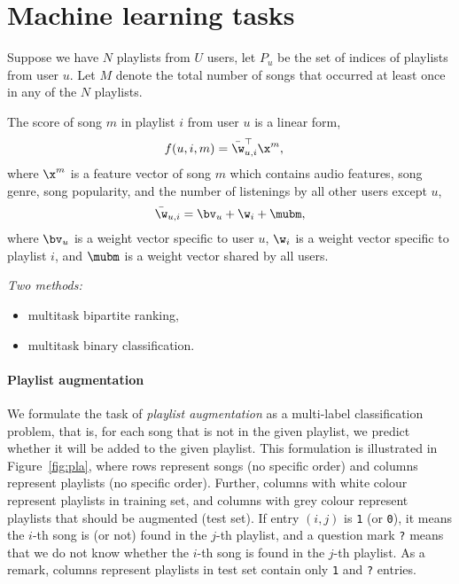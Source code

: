 \section{Machine learning tasks}

Suppose we have $N$ playlists from $U$ users, let $P_u$ be the set of indices of playlists from user $u$.
Let $M$ denote the total number of songs that occurred at least once in any of the $N$ playlists.

The score of song $m$ in playlist $i$ from user $u$ is a linear form,
\begin{equation*}
\begin{aligned}
f(u, i, m) &= \bar\w_{u,i}^\top \x^m,
\end{aligned}
\end{equation*}
where $\x^m$ is a feature vector of song $m$ which contains audio features, song genre, song popularity, 
and the number of listenings by all other users except $u$,
\begin{equation*}
\bar\w_{u,i} = \bv_u + \w_i + \mubm,
\end{equation*}
where $\bv_u$ is a weight vector specific to user $u$,
$\w_i$ is a weight vector specific to playlist $i$,
and $\mubm$ is a weight vector shared by all users.

{\it Two methods: 
\begin{itemize}
\item multitask bipartite ranking, 
\item multitask binary classification.
\end{itemize}
}

\paragraph{Playlist augmentation}

We formulate the task of \emph{playlist augmentation} as a multi-label classification problem,
that is, for each song that is not in the given playlist, 
we predict whether it will be added to the given playlist.
This formulation is illustrated in Figure~\ref{fig:pla},
where rows represent songs (no specific order) and columns represent playlists (no specific order).
Further, columns with white colour represent playlists in training set, 
and columns with grey colour represent playlists that should be augmented (\ie test set).
If entry $(i, j)$ is \texttt{1} (or \texttt{0}), 
it means the $i$-th song is (or not) found in the $j$-th playlist, 
and a question mark \texttt{?} means that we do not know whether the $i$-th song is found in the $j$-th playlist.
As a remark, columns represent playlists in test set contain only \texttt{1} and \texttt{?} entries.

